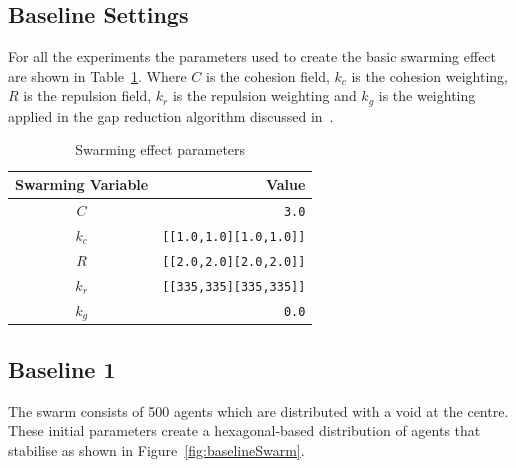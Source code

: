 \documentclass[12pt,a4paper]{IEEEtran}
\newcommand{\kc}{\mathit{k_c}}
\newcommand{\kr}{\mathit{k_r}}
\newcommand{\kg}{\mathit{k_g}}
\newcommand{\rb}{\mathit{R}}
\begin{document}
\subsection{Baseline Settings}
For all the experiments the parameters used to create the basic swarming effect are shown in Table~\ref{tab:swarmingEffect}. Where $C$ is the cohesion field, $\kc$ is the cohesion weighting, $\rb$ is the repulsion field, $\kr$ is the repulsion weighting and $\kg$ is the weighting applied in the gap reduction algorithm discussed in~\cite{eliot2019void}. 

\begin{table}[H]
	\centering
	\tiny
	\begin{tabular}{|c|r|}
		\hline
		\rowcolor[HTML]{000000} 
		{\color[HTML]{FFFFFF} Swarming Variable} & {\color[HTML]{FFFFFF} Value} \\ \hline
		$C$ & \texttt{3.0} \\ \hline
		$k_c$ & \texttt{[[1.0,1.0][1.0,1.0]]}  \\ \hline
		$R$ & \texttt{[[2.0,2.0][2.0,2.0]]} \\ \hline
		$k_r$ & \texttt{[[335,335][335,335]]} \\ \hline
		$k_g$ & \texttt{0.0} \\ \hline
	\end{tabular}
	\caption{Swarming effect parameters}
	\label{tab:swarmingEffect}
\end{table}

\subsection{Baseline 1}
The swarm consists of 500 agents which are distributed with a void at the centre. These initial parameters create a hexagonal-based distribution of agents that stabilise as shown in Figure~\ref{fig:baselineSwarm}. 
\end{document}

